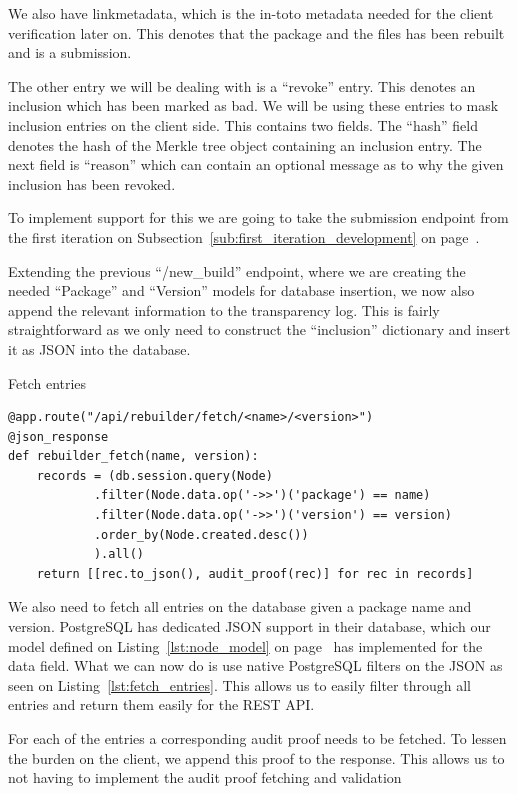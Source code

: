 \documentclass[../Main/thesis.tex]{subfiles}
\begin{document}
We also have linkmetadata, which is the in-toto metadata needed for the client
verification later on. This denotes that the package and the files has been
rebuilt and is a submission.

The other entry we will be dealing with is a ``revoke'' entry. This denotes an
inclusion which has been marked as bad. We will be using these entries to mask
inclusion entries on the client side. This contains two fields. The ``hash''
field denotes the hash of the Merkle tree object containing an inclusion entry.
The next field is ``reason'' which can contain an optional message as to why the
given inclusion has been revoked.

To implement support for this we are going to take the submission endpoint from
the first iteration on Subsection~\ref{sub:first_iteration_development} on
page~\pageref{sub:first_iteration_development}.

Extending the previous ``/new\_build'' endpoint, where we are creating the
needed ``Package'' and ``Version'' models for database insertion, we now also
append the relevant information to the transparency log. This is fairly
straightforward as we only need to construct the ``inclusion'' dictionary and
insert it as JSON into the database.

\begin{listing}[H]
\caption{Fetch entries}
\label{lst:fetch_entries}
\begin{verbatim}
@app.route("/api/rebuilder/fetch/<name>/<version>")
@json_response
def rebuilder_fetch(name, version):
    records = (db.session.query(Node)
            .filter(Node.data.op('->>')('package') == name)
            .filter(Node.data.op('->>')('version') == version)
            .order_by(Node.created.desc())
            ).all()
    return [[rec.to_json(), audit_proof(rec)] for rec in records]
\end{verbatim}
\end{listing}

We also need to fetch all entries on the database given a package name and
version. PostgreSQL has dedicated JSON support in their database, which our
model defined on Listing~\ref{lst:node_model} on page~\pageref{lst:node_model}
has implemented for the data field. What we can now do is use native PostgreSQL
filters on the JSON as seen on Listing~\ref{lst:fetch_entries}. This allows us
to easily filter through all entries and return them easily for the REST API.

For each of the entries a corresponding audit proof needs to be fetched. To
lessen the burden on the client, we append this proof to the response. This
allows us to not having to implement the audit proof fetching and validation 
\end{document}

